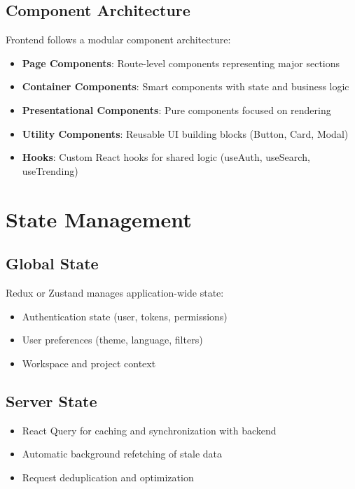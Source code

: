 \documentclass[12pt,a4paper]{report}
\begin{document}
\subsection{Component Architecture}

Frontend follows a modular component architecture:

\begin{itemize}[label=\textbullet]
    \item \textbf{Page Components}: Route-level components representing major sections
    \item \textbf{Container Components}: Smart components with state and business logic
    \item \textbf{Presentational Components}: Pure components focused on rendering
    \item \textbf{Utility Components}: Reusable UI building blocks (Button, Card, Modal)
    \item \textbf{Hooks}: Custom React hooks for shared logic (useAuth, useSearch, useTrending)
\end{itemize}

\section{State Management}

\subsection{Global State}

Redux or Zustand manages application-wide state:

\begin{itemize}[label=\textbullet]
    \item Authentication state (user, tokens, permissions)
    \item User preferences (theme, language, filters)
    \item Workspace and project context
\end{itemize}

\subsection{Server State}

\begin{itemize}[label=\textbullet]
    \item React Query for caching and synchronization with backend
    \item Automatic background refetching of stale data
    \item Request deduplication and optimization
\end{itemize}
\end{document}
